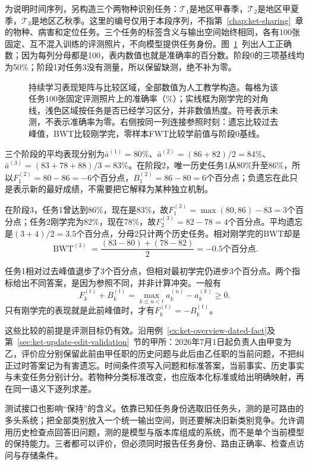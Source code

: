 为说明时间序列，另构造三个两物种识别任务：$\mathcal T_1$是地区甲春季，$\mathcal T_2$是地区甲夏季，$\mathcal T_3$是地区乙秋季。这里的编号仅用于本段序列，不指第~\ref{chap:ket-sharing}~章的物种、病害和定位任务。三个任务的标签含义与输出空间始终相同，各有100张固定、互不混入训练的评测照片，不向模型提供任务身份。图~\ref{fig:ket-evaluation-matrix}~列出人工正确数；因为每列分母都是100，表内数值也就是准确率的百分数。阶段0的三项基线均为50\%；阶段1对任务3没有测量，所以保留缺测，绝不补为零。

\begin{figure}[htbp]
  \centering
  
  \caption{持续学习表现矩阵与比较区域，全部数值为人工教学构造。每格为该任务100张固定评测照片上的准确率（\%）；实线框为刚学完的对角线，浅色区域按任务是否已经学习区分，并非数值热度。符号\textemdash 表示未测，不表示准确率为零。右侧按同一列连接参照时刻：遗忘比较过去峰值，BWT比较刚学完，零样本FWT比较学前值与阶段0基线。}
  \label{fig:ket-evaluation-matrix}
\end{figure}

三个阶段的平均表现分别为$\bar a^{(1)}=80\%$、$\bar a^{(2)}=(86+82)/2=84\%$、$\bar a^{(3)}=(83+78+88)/3=83\%$。在阶段2，唯一历史任务1从80\%升至86\%，所以$F_1^{(2)}=80-86=-6$个百分点，$B_1^{(2)}=86-80=6$个百分点；负遗忘在此只是表示新的最好成绩，不需要把它解释为某种独立机制。

\begin{samepage}
在阶段3，任务1曾达到86\%，现在是83\%，故$F_1^{(3)}=\max(80,86)-83=3$个百分点；任务2刚学完为82\%，现在78\%，故$F_2^{(3)}=82-78=4$个百分点。平均遗忘是$(3+4)/2=3.5$个百分点，分母2只计两个历史任务。相对刚学完的BWT却是
\[
  \operatorname{BWT}^{(3)}
  =\frac{(83-80)+(78-82)}2
  =-0.5\text{个百分点}.
\]

\end{samepage}
任务1相对过去峰值退步了3个百分点，但相对最初学完仍进步3个百分点。两个指标给出不同答案，是因为参照不同，并非计算冲突。一般有
\[
  F_k^{(t)}+B_k^{(t)}
  =\max_{k\leq u<t}a_k^{(u)}-a_k^{(k)}\geq0.
\]
只有刚学完的表现就是此前峰值时，才有$F_k^{(t)}=-B_k^{(t)}$。

这些比较的前提是评测目标仍有效。沿用例~\ref{ex:ket-overview-dated-fact}及第~\ref{sec:ket-update-edit-validation}~节的甲所：2026年7月1日起负责人由甲变为乙，评价应分别保留此前由甲任职的历史问题与此后由乙任职的当前问题，不把纠正过时答案记为有害遗忘。时间条件须写入问题和标准答案，当前事实、历史事实与未变任务分别计分。若物种分类标准改变，也应版本化标准或给出明确映射，再在同一语义下逐列求差。

测试接口也影响“保持”的含义。依靠已知任务身份选取旧任务头，测的是可路由的多头系统；把全部类别放入一个统一输出空间，则还要解决旧新类别竞争。允许调用历史检查点回答旧问题，测的是模型与版本库组成的系统，而不是单个当前模型的保持能力。三者都可以评价，但必须同时报告任务身份、路由正确率、检查点访问与存储条件。

